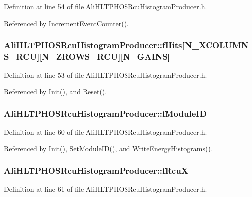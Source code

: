 Definition at line 54 of file Ali\-HLTPHOSRcu\-Histogram\-Producer.h.

Referenced by Increment\-Event\-Counter().
\subsubsection{ {\bf Ali\-HLTPHOSRcu\-Histogram\-Producer::f\-Hits}[N\_\-XCOLUMNS\_\-RCU][N\_\-ZROWS\_\-RCU][N\_\-GAINS]\hspace{0.3cm}{\tt  [private]}}\label{classAliHLTPHOSRcuHistogramProducer_r5}




Definition at line 53 of file Ali\-HLTPHOSRcu\-Histogram\-Producer.h.

Referenced by Init(), and Reset().
\subsubsection{ {\bf Ali\-HLTPHOSRcu\-Histogram\-Producer::f\-Module\-ID}\hspace{0.3cm}{\tt  [private]}}\label{classAliHLTPHOSRcuHistogramProducer_r10}




Definition at line 60 of file Ali\-HLTPHOSRcu\-Histogram\-Producer.h.

Referenced by Init(), Set\-Module\-ID(), and Write\-Energy\-Histograms().
\subsubsection{ {\bf Ali\-HLTPHOSRcu\-Histogram\-Producer::f\-Rcu\-X}\hspace{0.3cm}{\tt  [private]}}\label{classAliHLTPHOSRcuHistogramProducer_r11}




Definition at line 61 of file Ali\-HLTPHOSRcu\-Histogram\-Producer.h.


